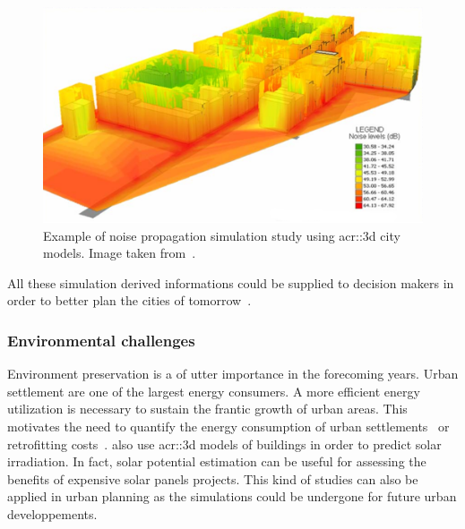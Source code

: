             \begin{figure}[htpb]
                \centering
                \includegraphics[width=\textwidth]{images/introduction/3d_model_applications/noise_simulation}
                \caption[
                    Example of noise propagation simulation study using \acrshort*{acr::3d} city models.
                ]{
                    \label{fig::noise_propogation}
                    Example of noise propagation simulation study using \gls{acr::3d} city models.
                    Image taken from~\parencite{kurakula2007gis}.
                }
            \end{figure}

            All these simulation derived informations could be supplied to decision makers in order to better plan the cities of tomorrow~\parencite{huck2019urban}.

        \subsubsection{Environmental challenges}
            Environment preservation is a of utter importance in the forecoming years.
            Urban settlement are one of the largest energy consumers.
            A more efficient energy utilization is necessary to sustain the frantic growth of urban areas.
            This motivates the need to quantify the energy consumption of urban settlements~\parencite{WATE20153372} or retrofitting costs~\parencite{previtali2014automatic}.
            \textcite{biljecki2015propagation} also use \gls{acr::3d} models of buildings in order to predict solar irradiation.
            In fact, solar potential estimation can be useful for assessing the benefits of expensive solar panels projects.
            This kind of studies can also be applied in urban planning as the simulations could be undergone for future urban developpements.

